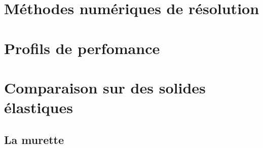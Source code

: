 \documentclass{CSMA2017}
\begin{document}
\section{Méthodes numériques de résolution}

\section{Profils de perfomance}

\section{Comparaison sur des solides élastiques}

\subsection{La murette}
\end{document}
